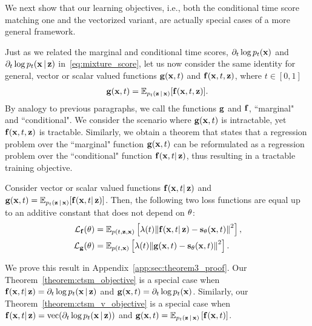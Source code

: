 We next show that our learning objectives, i.e., both the conditional time score matching one and the vectorized variant, are actually special cases of a more general framework.

Just as we related the marginal and conditional time scores, $\partial_t \log p_t(\bx)$ and $\partial_t \log p_t(\bx | \bz)$ in~\eqref{eq:mixture_score}, let us now consider the same identity for general, vector or scalar valued functions $\bg(\bx, t)$ and $\bbf(\bx, t, \bz)$, where $t\in [0,1]$
\begin{align}
    \label{eq:mixture_vector_field}
    \bg(\bx,t) 
    = 
    \E_{ p_{t}(\bz|\bx)}[
    \bbf(\bx,t, \bz)
    ].
\end{align}
By analogy to previous paragraphs, we call the functions $\bg$ and $\bbf$, ``marginal" and ``conditional". We consider the scenario where $\bg(\bx,t)$ is intractable, yet $\bbf(\bx,t,\bz)$ is tractable. Similarly, we obtain a theorem that states that a regression problem over the ``marginal" function $\bg(\bx,t)$ can be reformulated as a regression problem over the ``conditional" function $\bbf(\bx,t|\bz)$, thus resulting in a tractable training objective.
\begin{theorem}
    \label{theorem:marginal_vs_condition_regression}
    Consider vector or scalar valued functions $\bbf(\bx,t|\bz)$ and $\bg(\bx,t) = \E_{ p_{t}(\bz|\bx)}[\bbf(\bx,t|\bz)]$. Then, the following two loss functions are equal up to an additive constant that does not depend on $\btheta$:
    \begin{align}
    \mathcal{L}_{\bbf}(\btheta) 
    &= 
    \E_{p(t, \bz, \bx)}\left[\lambda(t)\norm{\bbf(\bx,t|\bz) - \bs_{\btheta}(\bx,t)}^2\right],
    \\
    \mathcal{L}_{\bg}(\btheta) 
    &= 
    \E_{p(t, \bx)}\left[\lambda(t)\norm{\bg(\bx,t) - \bs_{\btheta}(\bx,t)}^2\right].
    \end{align}
\end{theorem}
We prove this result in Appendix~\ref{app:sec:theorem3_proof}. 
Our Theorem~\ref{theorem:ctsm_objective} is a special case when $\bbf(\bx,t|\bz) = \partial_{t}\log p_{t}(\bx|\bz)$ and $\bg(\bx,t)= \partial_{t}\log p_{t}(\bx)$. Similarly, our Theorem~\ref{theorem:ctsm_v_objective} is a special case when $\bbf(\bx,t|\bz)=\vec(\partial_{t}\log p_{t}(\bx|\bz))$ and $\bg(\bx,t)=\E_{p_{t}(\bz|\bx)}\left[\bbf(\bx,t)\right]$. 

